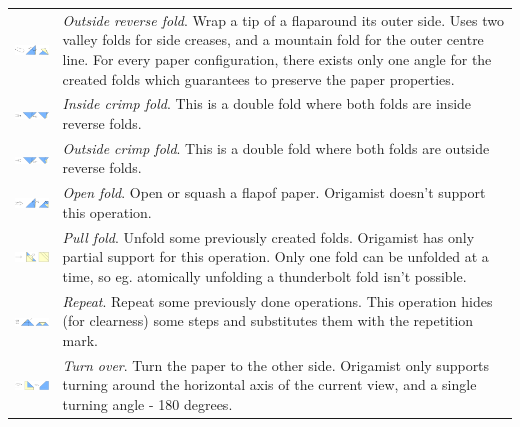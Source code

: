 \begin{savenotes}
\begin{longtable}{lp{9cm}}
\includegraphics[width=4cm]{images/folds_reverse_outside} & \emph{Outside reverse fold}. Wrap a tip of a flap\footnotemark[\value{footnote}] around its outer side. Uses two valley folds for side creases, and a mountain fold for the outer centre line. For every paper configuration, there exists only one angle for the created folds which guarantees to preserve the paper properties.\\
\includegraphics[width=4cm]{images/folds_crimp_inside} & \emph{Inside crimp fold}. This is a double fold where both folds are inside reverse folds.\\
\includegraphics[width=4cm]{images/folds_crimp_outside} & \emph{Outside crimp fold}. This is a double fold where both folds are outside reverse folds.\\
\includegraphics[width=4cm]{images/folds_open} & \emph{Open fold}. Open or squash a flap\footnotemark[\value{footnote}] of paper. Origamist doesn't support this operation.\\
\includegraphics[width=4cm]{images/folds_pull} & \emph{Pull fold}. Unfold some previously created folds. Origamist has only partial support for this operation. Only one fold can be unfolded at a time, so eg. atomically unfolding a thunderbolt fold isn't possible.\\
\includegraphics[width=4cm]{images/folds_repeat} & \emph{Repeat}. Repeat some previously done operations. This operation hides (for clearness) some steps and substitutes them with the repetition mark.\\
\includegraphics[width=4cm]{images/folds_turn_over} & \emph{Turn over}. Turn the paper to the other side. Origamist only supports turning around the horizontal axis of the current view, and a single turning angle - 180 degrees.\\

\end{longtable}
\end{savenotes}
